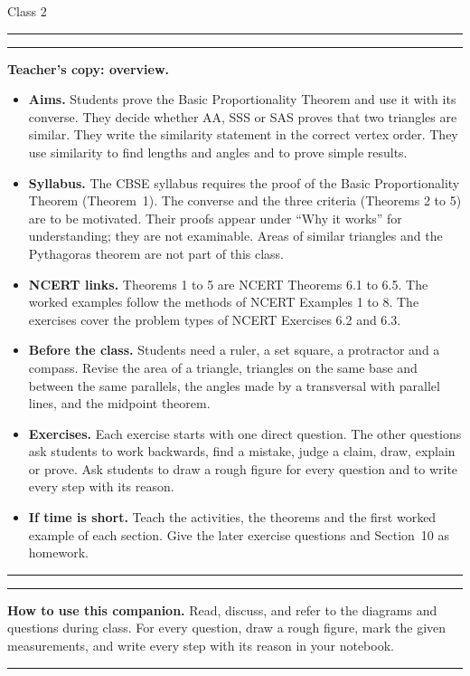 \documentclass[11pt,a4paper]{article}
\theoremstyle{brand}
\theoremstyle{branddef}
\renewcommand{\colorbox}[2]{\par\smallskip\noindent\textcolor{black!35}{\rule{\linewidth}{0.4pt}}\par\nointerlineskip\vspace{3pt}\noindent#2\par\vspace{2pt}\noindent\textcolor{black!35}{\rule{\linewidth}{0.4pt}}\par\smallskip}
\begin{document}
\hfill{\large Class 2}\par\vspace{3pt}
\noindent\rule{\linewidth}{0.6pt}\par\medskip

\ifteacher
\colorbox{panel}{%
  \parbox{\dimexpr\linewidth-2\fboxsep\relax}{%
    \small\textbf{Teacher's copy: overview.}
    \begin{itemize}[leftmargin=1.6em,itemsep=1pt,topsep=2pt]
      \item \textbf{Aims.} Students prove the Basic Proportionality Theorem and use it with its converse. They decide whether AA, SSS or SAS proves that two triangles are similar. They write the similarity statement in the correct vertex order. They use similarity to find lengths and angles and to prove simple results.
      \item \textbf{Syllabus.} The CBSE syllabus requires the proof of the Basic Proportionality Theorem (Theorem~1). The converse and the three criteria (Theorems 2 to 5) are to be motivated. Their proofs appear under ``Why it works'' for understanding; they are not examinable. Areas of similar triangles and the Pythagoras theorem are not part of this class.
      \item \textbf{NCERT links.} Theorems 1 to 5 are NCERT Theorems 6.1 to 6.5. The worked examples follow the methods of NCERT Examples 1 to 8. The exercises cover the problem types of NCERT Exercises 6.2 and 6.3.
      \item \textbf{Before the class.} Students need a ruler, a set square, a protractor and a compass. Revise the area of a triangle, triangles on the same base and between the same parallels, the angles made by a transversal with parallel lines, and the midpoint theorem.
      \item \textbf{Exercises.} Each exercise starts with one direct question. The other questions ask students to work backwards, find a mistake, judge a claim, draw, explain or prove. Ask students to draw a rough figure for every question and to write every step with its reason.
      \item \textbf{If time is short.} Teach the activities, the theorems and the first worked example of each section. Give the later exercise questions and Section~10 as homework.
    \end{itemize}}}
\else
\colorbox{panel}{%
  \parbox{\dimexpr\linewidth-2\fboxsep\relax}{%
    \textbf{\color{accent}How to use this companion.}
    Read, discuss, and refer to the diagrams and questions during class. For every question, draw a rough figure, mark the given measurements, and write every step with its reason in your notebook.}}
\fi
\end{document}
